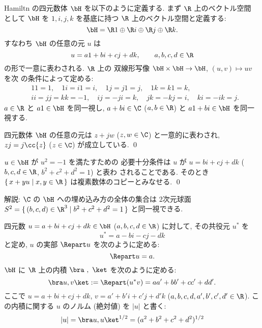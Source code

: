 \documentclass[12pt,twoside]{jarticle}
\begin{document}
Hamiltn の四元数体 $\bH$ を以下のように定義する.  まず $\R$ 上のベクトル空間
として $\bH$ を $1,i,j,k$ を基底に持つ $\R$ 上のベクトル空間と定義する:
\begin{equation*}
  \bH = \R 1 \oplus \R i \oplus \R j \oplus \R k.
\end{equation*}
すなわち $\bH$ の任意の元 $u$ は 
\begin{equation*}
  u = a 1 + b i + c j + d k, \qquad a,b,c,d\in\R
\end{equation*}
の形で一意に表わされる.  $\R$ 上の
双線形写像 $\bH\times\bH\to\bH$, $(u,v)\mapsto uv$ を次
の条件によって定める:
\begin{align*}
  &
  11=1, \quad
  1i=i1=i, \quad
  1j=j1=j, \quad
  1k=k1=k, \quad
  \\ &
  ii=jj=kk=-1, \quad
  ij=-ji=k, \quad
  jk=-kj=i, \quad
  ki=-ik=j.
\end{align*}
$a\in\R$ と $a1\in\bH$ を同一視し,
$a+bi\in\C$ ($a,b\in\R$) と $a1+bi\in\bH$ を同一視する.


\begin{question}
  四元数体 $\bH$ の任意の元は $z+jw$ ($z,w\in\C$) と一意的に表わされ,
  $zj=j\cc{z}$ ($z\in\C$) が成立している.  \qed
\end{question}


\begin{question}
  $u\in\bH$ が $u^2=-1$ を満たすための
  必要十分条件は $u$ が $u=bi+cj+dk$ ($b,c,d\in\R$, $b^2+c^2+d^2=1$) と表わ
  されることである. 
  そのとき $\{\,x+yu\mid x,y\in\R\,\}$ は複素数体のコピーとみなせる.
  \qed
\end{question}

\noindent
解説: $\C$ の $\bH$ への埋め込み方の全体の集合は
2次元球面 $S^2=\{\,(b,c,d)\in\R^3\mid b^2+c^2+d^2=1\,\}$ と同一視できる.

\medskip

四元数 $u = a + bi + cj + dk\in\bH$ ($a,b,c,d\in\R$) に対して,
その共役元 $u^*$ を
\begin{equation*}
  u^* = a - bi - cj - dk
\end{equation*}
と定め, $u$ の実部 $\Repart u$ を次のように定める:
\begin{equation*}
  \Repart u = a.
\end{equation*}
$\bH$ に $\R$ 上の内積 $\bra\ ,\ \ket$ を次のように定める:
\begin{equation*}
  \bra u,v\ket := \Repart(u^*v) = aa' + bb' + cc' + dd'.
\end{equation*}
ここで $u=a+bi+cj+dk$, $v=a'+b'i+c'j+d'k$ ($a,b,c,d,a',b',c',d'\in\R$).
この内積に関する $u$ のノルム (絶対値) を $|u|$ と書く:
\begin{equation*}
  |u| = \bra u,u\ket^{1/2} = (a^2 + b^2 + c^2 + d^2)^{1/2}
\end{equation*}
\end{document}

